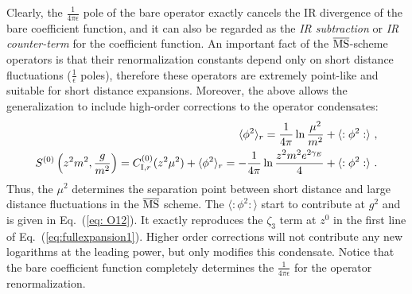\documentclass[a4paper,11pt]{article}
\begin{document}
Clearly, the $\frac{1}{4\pi \epsilon}$ pole of the bare operator exactly cancels the IR divergence of the bare coefficient function, and it can also be regarded as the  {\it IR subtraction} or {\it IR counter-term } for the coefficient function.  An important fact of the $\overline{\rm MS}$-scheme operators is that their renormalization constants depend only on short distance fluctuations ($\frac{1}{\epsilon}$ poles), therefore these operators are extremely point-like and suitable for short distance expansions. Moreover, the above allows the generalization to include high-order corrections to the operator condensates:
\begin{align}
\langle \phi^2\rangle_r=\frac{1}{4\pi}\ln \frac{\mu^2}{m^2}+\langle :\phi^2:\rangle \ , \\ 
S^{(0)}\left(z^2m^2,\frac{g}{m^2}\right)=C^{(0)}_{{\rm I},r}(z^2\mu^2)+\langle \phi^2\rangle_r=-\frac{1}{4\pi}\ln \frac{z^2m^2e^{2\gamma_E}}{4}+\langle :\phi^2:\rangle \ .
\end{align}
Thus, the $\mu^2$ determines the separation point between short distance and large distance fluctuations in the $\overline{\rm MS}$ scheme. The $\langle :\phi^2:\rangle$ start to contribute at $g^2$ and is given in Eq.~(\ref{eq: O12}). It exactly reproduces the $\zeta_3$ term at $z^0$ in the first line of Eq.~(\ref{eq:fullexpansion1}).  Higher order corrections will not contribute any new logarithms at the leading power, but only modifies this condensate. Notice that the bare coefficient function completely determines the $\frac{1}{4\pi \epsilon}$ for the operator renormalization. 
\end{document}
